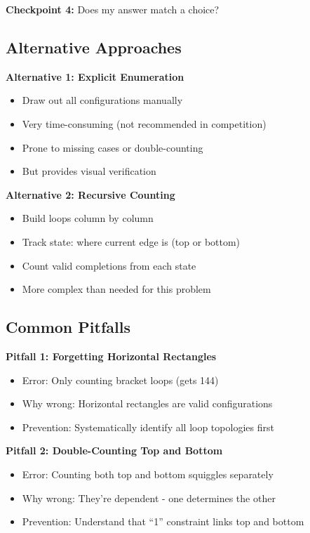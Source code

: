 \documentclass[12pt]{article}
\begin{document}
\begin{solutionbox}
\textbf{Checkpoint 4:} Does my answer match a choice?

\subsection*{Alternative Approaches}

\textbf{Alternative 1: Explicit Enumeration}
\begin{itemize}
    \item Draw out all configurations manually
    \item Very time-consuming (not recommended in competition)
    \item Prone to missing cases or double-counting
    \item But provides visual verification
\end{itemize}

\textbf{Alternative 2: Recursive Counting}
\begin{itemize}
    \item Build loops column by column
    \item Track state: where current edge is (top or bottom)
    \item Count valid completions from each state
    \item More complex than needed for this problem
\end{itemize}

\subsection*{Common Pitfalls}

\textbf{Pitfall 1: Forgetting Horizontal Rectangles}
\begin{itemize}
    \item Error: Only counting bracket loops (gets 144)
    \item Why wrong: Horizontal rectangles are valid configurations
    \item Prevention: Systematically identify all loop topologies first
\end{itemize}

\textbf{Pitfall 2: Double-Counting Top and Bottom}
\begin{itemize}
    \item Error: Counting both top and bottom squiggles separately
    \item Why wrong: They're dependent - one determines the other
    \item Prevention: Understand that ``1'' constraint links top and bottom
\end{itemize}


\end{solutionbox}
\end{document}
